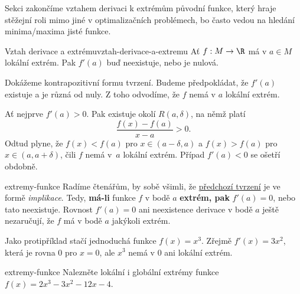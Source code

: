 Sekci zakončíme vztahem derivaci k extrémům původní funkce, který hraje stěžejní
roli mimo jiné v optimalizačních problémech, bo často vedou na hledání
minima/maxima jisté funkce.

\begin{proposition}{Vztah derivace a extrému}{vztah-derivace-a-extremu}
 Ať $f:M \to \R$ má v $a \in M$ lokální extrém. Pak $f'(a)$ buď neexistuje, nebo
 je nulová.
\end{proposition}
\begin{propproof}
 Dokážeme kontrapozitivní formu tvrzení. Budeme předpokládat, že $f'(a)$
 existuje a je různá od nuly. Z toho odvodíme, že $f$ nemá v $a$ lokální extrém.

 Ať nejprve $f'(a) > 0$. Pak existuje okolí $R(a,\delta)$, na němž platí
 \[
  \frac{f(x) - f(a)}{x - a} > 0.
 \]
 Odtud plyne, že $f(x) < f(a)$ pro $x \in (a - \delta,a)$ a $f(x) > f(a)$ pro $x
 \in (a,a+\delta)$, čili $f$ nemá v~$a$ lokální extrém. Případ $f'(a) < 0$ se
 ošetří obdobně.
\end{propproof}

\begin{warning}{}{extremy-funkce}
 Radíme čtenářům, by sobě všimli, že
 \hyperref[prop:vztah-derivace-a-extremu]{předchozí tvrzení} je ve formě
 \emph{implikace}. Tedy, \textbf{má-li} funkce $f$ v bodě $a$ \textbf{extrém,
 pak} $f'(a) = 0$, nebo tato neexistuje. Rovnost $f'(a) = 0$ ani neexistence
 derivace v bodě $a$ ještě nezaručují, že $f$ má v bodě $a$ jakýkoli extrém.

 Jako protipříklad stačí jednoduchá funkce $f(x) = x^3$. Zřejmě $f'(x) = 3x^2$,
 která je rovna $0$ pro $x = 0$, ale $x^3$ nemá v $0$ ani lokální extrém.
\end{warning}

\begin{exercise}{}{extremy-funkce}
 Nalezněte lokální i globální extrémy funkce $f(x) = 2 x^{3} - 3 x^{2} - 12 x -
 4$.
\end{exercise}

